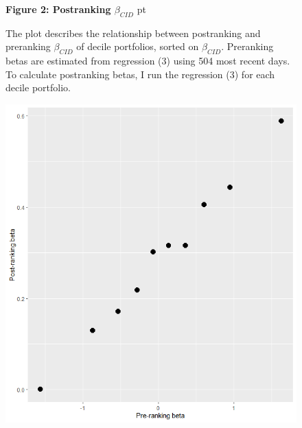 \documentclass[12pt]{article}
\begin{document}
\begin{figure}
\textbf{Figure 2: Postranking $\beta_{CID}$}
 pt
\begin{flushleft}
{The plot describes the relationship between postranking and preranking $\beta_{CID}$ of decile portfolios, sorted on $\beta_{CID}$. Preranking betas are estimated from regression (3) using 504 most recent days. To calculate postranking betas, I run the  regression (3) for each decile portfolio.}
\end{flushleft}
\centering
\includegraphics[width=1\textwidth]{paper_b3/Figure2.png}
\end{figure}
\end{document}
